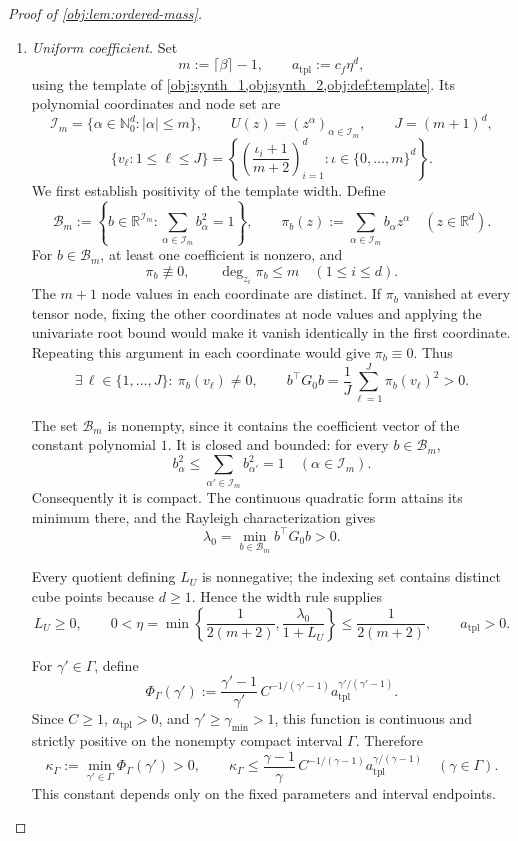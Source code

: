\begin{proof}[Proof of \cref{obj:lem:ordered-mass}]
\begin{enumerate}
\item \emph{Uniform coefficient.}
Set
\[
m:=\lceil\beta\rceil-1,
\qquad
a_{\mathrm{tpl}}:=c_f\eta^d,
\]
using the template of \cref{obj:synth_1,obj:synth_2,obj:def:template}. Its polynomial coordinates and node set are
\[
\mathcal I_m=\{\alpha\in\mathbb N_0^d:|\alpha|\le m\},
\qquad
U(z)=(z^\alpha)_{\alpha\in\mathcal I_m},
\qquad
J=(m+1)^d,
\]
\[
\{v_\ell:1\le\ell\le J\}
=
\left\{
\left(\frac{\iota_i+1}{m+2}\right)_{i=1}^d:
\iota\in\{0,\ldots,m\}^d
\right\}.
\]
We first establish positivity of the template width. Define
\[
\mathcal B_m:=
\left\{
b\in\mathbb R^{\mathcal I_m}:
\sum_{\alpha\in\mathcal I_m}b_\alpha^2=1
\right\},
\qquad
\pi_b(z):=\sum_{\alpha\in\mathcal I_m}b_\alpha z^\alpha
\quad(z\in\mathbb R^d).
\]
For \(b\in\mathcal B_m\), at least one coefficient is nonzero, and
\[
\pi_b\not\equiv0,
\qquad
\deg_{z_i}\pi_b\le m
\quad(1\le i\le d).
\]
The \(m+1\) node values in each coordinate are distinct. If \(\pi_b\) vanished at every tensor node, fixing the other coordinates at node values and applying the univariate root bound would make it vanish identically in the first coordinate. Repeating this argument in each coordinate would give \(\pi_b\equiv0\). Thus
\[
\exists\,\ell\in\{1,\ldots,J\}:\ \pi_b(v_\ell)\ne0,
\qquad
b^\top G_0b
=
\frac1J\sum_{\ell=1}^J\pi_b(v_\ell)^2>0.
\]

The set \(\mathcal B_m\) is nonempty, since it contains the coefficient vector of the constant polynomial \(1\). It is closed and bounded: for every \(b\in\mathcal B_m\),
\[
b_\alpha^2\le
\sum_{\alpha'\in\mathcal I_m}b_{\alpha'}^2=1
\quad(\alpha\in\mathcal I_m).
\]
Consequently it is compact. The continuous quadratic form attains its minimum there, and the Rayleigh characterization gives
\[
\lambda_0
=
\min_{b\in\mathcal B_m}b^\top G_0b>0.
\]

Every quotient defining \(L_U\) is nonnegative; the indexing set contains distinct cube points because \(d\ge1\). Hence the width rule supplies
\[
L_U\ge0,
\qquad
0<\eta
=
\min\left\{\frac1{2(m+2)},\frac{\lambda_0}{1+L_U}\right\}
\le\frac1{2(m+2)},
\qquad
a_{\mathrm{tpl}}>0.
\]

For \(\gamma'\in\Gamma\), define
\[
\Phi_\Gamma(\gamma')
:=
\frac{\gamma'-1}{\gamma'}\,
C^{-1/(\gamma'-1)}
a_{\mathrm{tpl}}^{\gamma'/(\gamma'-1)}.
\]
Since \(C\ge1\), \(a_{\mathrm{tpl}}>0\), and
\(\gamma'\ge\gamma_{\min}>1\), this function is continuous and strictly positive on the nonempty compact interval \(\Gamma\). Therefore
\[
\kappa_\Gamma:=\min_{\gamma'\in\Gamma}\Phi_\Gamma(\gamma')>0,
\qquad
\kappa_\Gamma\le
\frac{\gamma-1}{\gamma}\,
C^{-1/(\gamma-1)}
a_{\mathrm{tpl}}^{\gamma/(\gamma-1)}
\quad(\gamma\in\Gamma).
\]
This constant depends only on the fixed parameters and interval endpoints.


\end{enumerate}
\end{proof}
